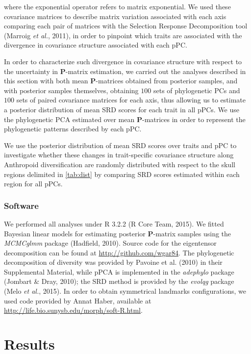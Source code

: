 \documentclass[12pt,twoside]{report}
\begin{document}
where the exponential operator refers to matrix exponential. We used
these covariance matrices to describe matrix variation associated with
each axis comparing each pair of matrices with the Selection Response
Decomposition tool (Marroig \emph{et al.}, 2011), in order to pinpoint
which traits are associated with the divergence in covariance structure
associated with each pPC.

In order to characterize such divergence in covariance structure with
respect to the uncertainty in $\mathbf{P}$-matrix estimation, we carried
out the analyses described in this section with both mean
$\mathbf{P}$-matrices obtained from posterior samples, and with
posterior samples themselves, obtaining $100$ sets of phylogenetic PCs
and $100$ sets of paired covariance matrices for each axis, thus
allowing us to estimate a posterior distribution of mean SRD scores for
each trait in all pPCs. We use the phylogenetic PCA estimated over mean
$\mathbf{P}$-matrices in order to represent the phylogenetic patterns
described by each pPC.

We use the posterior distribution of mean SRD scores over traits and pPC
to investigate whether these changes in trait-specific covariance
structure along Anthropoid diversification are randomly distributed with
respect to the skull regions delimited in \autoref{tab:dist} by
comparing SRD scores estimated within each region for all pPCs.

\subsubsection{Software}\label{software-2}

We performed all analyses under R 3.2.2 (R Core Team, 2015). We fitted
Bayesian linear models for estimating posterior $\mathbf{P}$-matrix
samples using the \emph{MCMCglmm} package (Hadfield, 2010). Source code
for the eigentensor decomposition can be found at
\url{http://github.com/wgar84}. The phylogenetic decomposition of
diversity was provided by Pavoine et al. (2010) in their Supplemental
Material, while pPCA is implemented in the \emph{adephylo} package
(Jombart \& Dray, 2010); the SRD method is provided by the \emph{evolqg}
package (Melo \emph{et al.}, 2015). In order to obtain symmetrical
landmarks configurations, we used code provided by Annat Haber,
available at \url{http://life.bio.sunysb.edu/morph/soft-R.html}.

\section{Results}\label{results-2}
\end{document}

